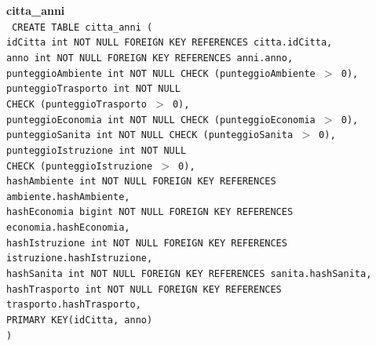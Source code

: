 \documentclass[a4paper,12pt]{report}
\begin{document}
                \noindent
                {\large \textbf{citta\_anni}} \\
                \texttt{
                    CREATE TABLE citta\_anni ( \\
                    \null\quad\quad idCitta int NOT NULL FOREIGN KEY REFERENCES citta.idCitta, \\
                    \null\quad\quad anno int NOT NULL FOREIGN KEY REFERENCES anni.anno, \\
                    \null\quad\quad punteggioAmbiente       int     NOT NULL CHECK (punteggioAmbiente $>$ 0), \\
                    \null\quad\quad punteggioTrasporto      int     NOT NULL \\
                            \null\qquad\qquad CHECK (punteggioTrasporto $>$ 0), \\
                    \null\quad\quad punteggioEconomia       int     NOT NULL CHECK (punteggioEconomia $>$ 0), \\
                    \null\quad\quad punteggioSanita         int     NOT NULL CHECK (punteggioSanita $>$ 0), \\
                    \null\quad\quad punteggioIstruzione     int     NOT NULL \\
                            \null\qquad\qquad CHECK (punteggioIstruzione $>$ 0), \\
                    \null\quad\quad hashAmbiente         int     NOT NULL FOREIGN KEY REFERENCES ambiente.hashAmbiente, \\  
                    \null\quad\quad hashEconomia         bigint     NOT NULL FOREIGN KEY REFERENCES economia.hashEconomia, \\  
                    \null\quad\quad hashIstruzione         int     NOT NULL FOREIGN KEY REFERENCES istruzione.hashIstruzione, \\  
                    \null\quad\quad hashSanita         int     NOT NULL FOREIGN KEY REFERENCES sanita.hashSanita, \\  
                    \null\quad\quad hashTrasporto         int     NOT NULL FOREIGN KEY REFERENCES trasporto.hashTrasporto, \\  
                    \null\quad\quad PRIMARY KEY(idCitta, anno) \\
                    )
                } \\
\end{document}
